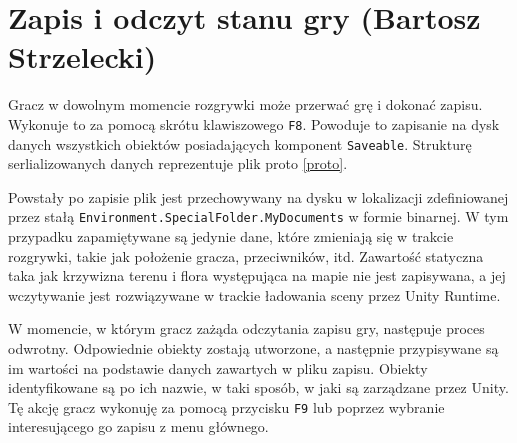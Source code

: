 \section{Zapis i odczyt stanu gry (Bartosz Strzelecki)}\label{s:save_impl}

Gracz w dowolnym momencie rozgrywki może przerwać grę i dokonać zapisu. Wykonuje to
za pomocą skrótu klawiszowego \texttt{F8}. Powoduje to zapisanie na dysk danych wszystkich obiektów posiadających
komponent \texttt{Saveable}. Strukturę serlializowanych danych reprezentuje plik proto \ref{proto}.


Powstały po zapisie plik jest przechowywany na dysku w lokalizacji zdefiniowanej przez stałą \verb|Environment.SpecialFolder.MyDocuments| w formie binarnej.
W tym przypadku zapamiętywane są jedynie dane, które zmieniają się w trakcie rozgrywki, takie jak położenie gracza, przeciwników, itd. 
Zawartość statyczna taka jak krzywizna terenu i flora występująca na mapie nie jest zapisywana, a jej wczytywanie jest rozwiązywane
w trackie ładowania sceny przez Unity Runtime.

W momencie, w którym gracz zażąda odczytania zapisu gry, następuje proces odwrotny. Odpowiednie obiekty zostają utworzone,
a następnie przypisywane są im wartości na podstawie danych zawartych w pliku zapisu. Obiekty identyfikowane
są po ich nazwie, w taki sposób, w jaki są zarządzane przez Unity.
Tę akcję gracz wykonuję za pomocą przycisku \texttt{F9} lub poprzez wybranie interesującego go zapisu z menu głównego.

